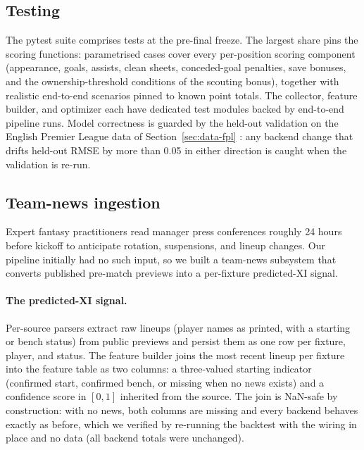 \subsection{Testing}
\label{sec:implementation-testing}

The pytest suite comprises \TestCount{} tests at the pre-final
freeze. The largest share pins the scoring functions:
parametrised cases cover every per-position scoring component
(appearance, goals, assists, clean sheets, conceded-goal penalties,
save bonuses, and the ownership-threshold conditions of the scouting
bonus), together with realistic end-to-end scenarios pinned to known
point totals. The collector, feature builder, and optimizer each
have dedicated test modules backed by end-to-end pipeline runs.
Model correctness is guarded by the held-out validation on the
English Premier League data of Section~\ref{sec:data-fpl}
\citep{vaastav}: any backend change that drifts held-out RMSE by
more than 0.05 in either direction is caught when the validation is
re-run.

\subsection{Team-news ingestion}
\label{sec:implementation-team-news}

Expert fantasy practitioners read manager press conferences roughly
24 hours before kickoff to anticipate rotation, suspensions, and
lineup changes. Our pipeline initially had no such input, so we
built a team-news subsystem that converts published pre-match
previews into a per-fixture predicted-XI signal.

\paragraph{The predicted-XI signal.}
Per-source parsers extract raw lineups (player names as printed,
with a starting or bench status) from public previews and persist
them as one row per fixture, player, and status. The feature builder
joins the most recent lineup per fixture into the feature table as
two columns: a three-valued starting indicator (confirmed start,
confirmed bench, or missing when no news exists) and a confidence
score in $[0,1]$ inherited from the source. The join is NaN-safe by
construction: with no news, both columns are missing and every
backend behaves exactly as before, which we verified by re-running
the backtest with the wiring in place and no data (all backend
totals were unchanged).

